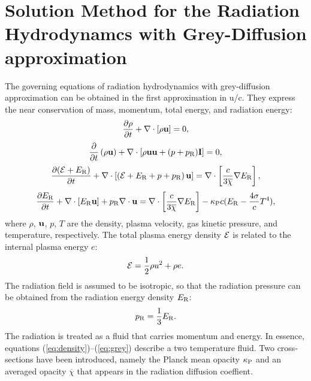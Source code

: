 \documentclass[12pt]{article}
\newcommand{\Erad}{E_{\rm R}}
\newcommand{\prad}{p_{\rm R}}
\newcommand{\kappaP}{\kappa_{\rm P}}
\begin{document}
\section{Solution Method for the Radiation Hydrodynamcs with Grey-Diffusion approximation}  
The governing equations of radiation hydrodynamics with grey-diffusion 
approximation can be obtained in the first approximation in u/c. They 
express the near conservation of mass, momentum, total energy, and 
radiation energy: 
\begin{equation}\label{eq:density} \frac{\partial\rho}{\partial t} +
\nabla\cdot\left[ \rho {\bf u} \right] = 0, 
\end{equation} 
\begin{equation}   \frac{\partial}{\partial t}\left( \rho {\bf u} \right) +
 \nabla\cdot\left[ \rho{\bf u}{\bf u}     +(p+\prad){\bf I} \right] = 0, 
\end{equation} 
\begin{equation}   \frac{\partial ({\cal E} + \Erad)}{\partial t} + 
\nabla\cdot   \left[ \left( {\cal E} + \Erad+ p+\prad \right) {\bf u} 
\right]   = \nabla\cdot\left[ \frac{c}{ 3 \overline{\chi} } \nabla \Erad 
\right], 
\end{equation}\label{eq:energy} 
\begin{equation}\label{eq:grey}   \frac{\partial \Erad}{\partial t} + 
\nabla\cdot \left[ \Erad {\bf u} \right]   + \prad\nabla\cdot{\bf u} 
=    \nabla\cdot\left[ \frac{c}{ 3\overline{\chi} } \nabla \Erad \right]   
-\kappaP c (\Erad - \frac{4\sigma}{c} T^4), 
\end{equation} 
where $\rho$, ${\bf u}$, $p$, $T$ are the density, plasma velocity, gas 
kinetic pressure, and temperature, respectively. The total plasma energy 
density ${\cal E}$ is related to the internal plasma energy $e$: 
\begin{equation} 
{\cal E} = \frac{1}{2}\rho u^2 + \rho e. 
\end{equation} 
The radiation field is assumed to be isotropic, so that the radiation 
pressure can be obtained from the radiation energy density $\Erad$: 
\begin{equation} 
\prad = \frac{1}{3}\Erad. 
\end{equation} 
The radiation is treated as a fluid that carries momentum and energy. 
In essence, equations (\ref{eq:density})--(\ref{eq:grey}) describe a two 
temperature fluid. Two cross-sections have been introduced, namely the 
Planck mean opacity $\kappa_{\rm P}$ and an averaged opacity 
$\overline{\chi}$ that appears in the radiation diffusion coeffient.  
\end{document}
